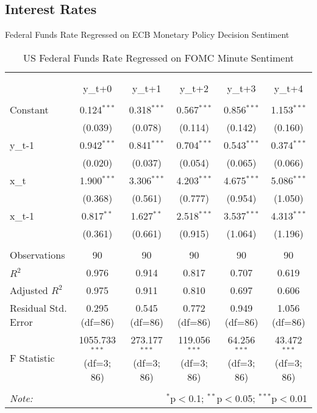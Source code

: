 \documentclass[12pt, letterpaper]{article}
\begin{document}
\subsection{Interest Rates}

Federal Funds Rate Regressed on ECB Monetary Policy Decision Sentiment

\begin{table}[H] \centering
  \caption{US Federal Funds Rate Regressed on FOMC Minute Sentiment}
\begin{tabular}{@{\extracolsep{5pt}}lccccc}
\\[-1.8ex]\hline
\hline \\[-1.8ex]
\\[-1.8ex] & \multicolumn{1}{c}{y_{t+0}} & \multicolumn{1}{c}{y_{t+1}} & \multicolumn{1}{c}{y_{t+2}} & \multicolumn{1}{c}{y_{t+3}} & \multicolumn{1}{c}{y_{t+4}}  \\
\hline \\[-1.8ex]
 Constant & 0.124$^{***}$ & 0.318$^{***}$ & 0.567$^{***}$ & 0.856$^{***}$ & 1.153$^{***}$ \\
& (0.039) & (0.078) & (0.114) & (0.142) & (0.160) \\
 y_{t-1} & 0.942$^{***}$ & 0.841$^{***}$ & 0.704$^{***}$ & 0.543$^{***}$ & 0.374$^{***}$ \\
& (0.020) & (0.037) & (0.054) & (0.065) & (0.066) \\
 x_{t} & 1.900$^{***}$ & 3.306$^{***}$ & 4.203$^{***}$ & 4.675$^{***}$ & 5.086$^{***}$ \\
& (0.368) & (0.561) & (0.777) & (0.954) & (1.050) \\
 x_{t-1} & 0.817$^{**}$ & 1.627$^{**}$ & 2.518$^{***}$ & 3.537$^{***}$ & 4.313$^{***}$ \\
& (0.361) & (0.661) & (0.915) & (1.064) & (1.196) \\
\hline \\[-1.8ex]
 Observations & 90 & 90 & 90 & 90 & 90 \\
 $R^2$ & 0.976 & 0.914 & 0.817 & 0.707 & 0.619 \\
 Adjusted $R^2$ & 0.975 & 0.911 & 0.810 & 0.697 & 0.606 \\
 Residual Std. Error & 0.295 (df=86) & 0.545 (df=86) & 0.772 (df=86) & 0.949 (df=86) & 1.056 (df=86) \\
 F Statistic & 1055.733$^{***}$ (df=3; 86) & 273.177$^{***}$ (df=3; 86) & 119.056$^{***}$ (df=3; 86) & 64.256$^{***}$ (df=3; 86) & 43.472$^{***}$ (df=3; 86) \\
\hline
\hline \\[-1.8ex]
\textit{Note:} & \multicolumn{5}{r}{$^{*}$p$<$0.1; $^{**}$p$<$0.05; $^{***}$p$<$0.01} \\
\end{tabular}
\end{table}
\end{document}
